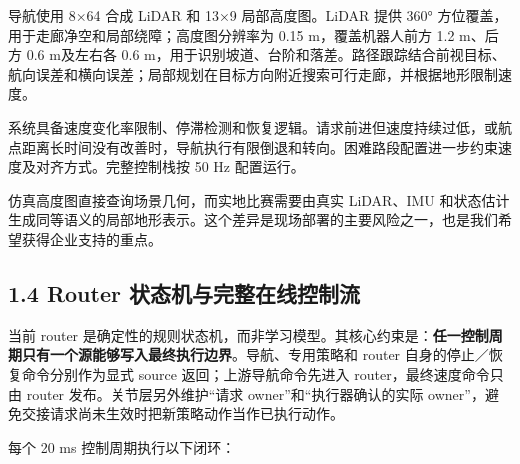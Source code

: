 \documentclass[
  11pt,
  a4paper,
]{article}
\begin{document}
导航使用 8×64 合成 LiDAR 和 13×9 局部高度图。LiDAR 提供 360°
方位覆盖，用于走廊净空和局部绕障；高度图分辨率为 0.15 m，覆盖机器人前方
1.2 m、后方 0.6 m及左右各 0.6
m，用于识别坡道、台阶和落差。路径跟踪结合前视目标、航向误差和横向误差；局部规划在目标方向附近搜索可行走廊，并根据地形限制速度。

系统具备速度变化率限制、停滞检测和恢复逻辑。请求前进但速度持续过低，或航点距离长时间没有改善时，导航执行有限倒退和转向。困难路段配置进一步约束速度及对齐方式。完整控制栈按
50 Hz 配置运行。

仿真高度图直接查询场景几何，而实地比赛需要由真实 LiDAR、IMU
和状态估计生成同等语义的局部地形表示。这个差异是现场部署的主要风险之一，也是我们希望获得企业支持的重点。

\subsection{1.4 Router
状态机与完整在线控制流}\label{router-ux72b6ux6001ux673aux4e0eux5b8cux6574ux5728ux7ebfux63a7ux5236ux6d41}

当前 router
是确定性的规则状态机，而非学习模型。其核心约束是：\textbf{任一控制周期只有一个源能够写入最终执行边界}。导航、专用策略和
router 自身的停止／恢复命令分别作为显式 source 返回；上游导航命令先进入
router，最终速度命令只由 router 发布。关节层另外维护``请求
owner''和``执行器确认的实际
owner''，避免交接请求尚未生效时把新策略动作当作已执行动作。

每个 20 ms 控制周期执行以下闭环：
\end{document}
